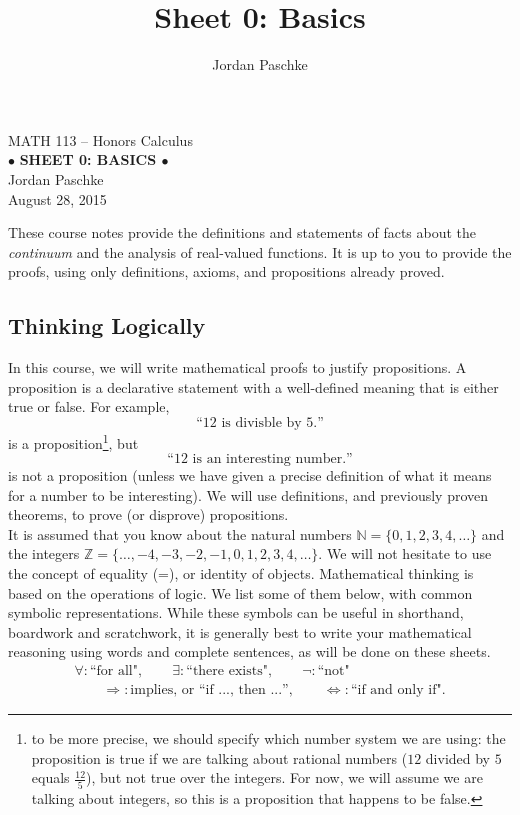 \documentclass[12pt]{article}
\title{Sheet 0: Basics}
\author{Jordan Paschke}
\date{}
\theoremstyle{definition}
\numberwithin{equation}{subsection}
\begin{document}
\pagestyle{plain}



\begin{center}
{\large  MATH 113 -- Honors Calculus\\
$\bullet$ \quad \textbf{SHEET 0: BASICS \quad $\bullet$}}  \\ 
\vspace{.2in}  
Jordan Paschke\\August 28, 2015
\end{center}

\bigskip \bigskip







\bigskip \bigskip

These course notes provide the definitions and statements of facts about the \emph{continuum} and the analysis of real-valued functions.  It is up to you to provide the proofs, using only definitions, axioms, and propositions already proved.

\subsection*{Thinking Logically}

In this course, we will write mathematical proofs to justify propositions.  A proposition is a declarative statement with a well-defined meaning that is either true or false.  For example,
\[
\text{``$12$ is divisble by 5.''}
\]
is a proposition\footnote{to be more precise, we should specify which number system we are using: the proposition is true if we are talking about rational numbers ($12$ divided by $5$ equals $\frac{12}{5}$), but not true over the integers. For now, we will assume we are talking about integers, so this is a proposition that happens to be false.}, but 
\[
\text{``$12$ is an interesting number.''}
\]
is not a proposition (unless we have given a precise definition of what it means for a number to be interesting). We will use definitions, and previously proven theorems, to prove (or disprove) propositions.\\


It is assumed that you know about the natural numbers $\mathbb{N} = \{0, 1, 2, 3, 4, \dotsc \}$ and the integers $\mathbb{Z} = \{ \dotsc, -4, -3, -2, -1, 0, 1, 2, 3, 4, \dotsc \}$.  We will not hesitate to use the concept of equality (=), or identity of objects.  Mathematical thinking is based on the operations of logic.  We list some of them below, with common symbolic representations.  While these symbols can be useful in shorthand, boardwork and scratchwork, it is generally best to write your mathematical reasoning using words and complete sentences, as will be done on these sheets.
\begin{gather*}
\forall: \text{``for all"}, \qquad \exists: \text{``there exists"}, \qquad \neg: \text{``not"} \\
 \qquad \Longrightarrow : \text{implies, or ``if ..., then ...''},  \qquad \Longleftrightarrow: \text{``if and only if"}.
\end{gather*}\vspace{.1cm}
\end{document}
